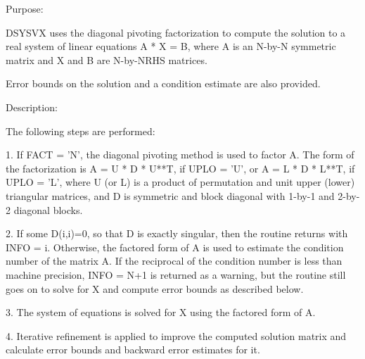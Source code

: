  \begin{DoxyParagraph}{Purpose\+: }
\begin{DoxyVerb} DSYSVX uses the diagonal pivoting factorization to compute the
 solution to a real system of linear equations A * X = B,
 where A is an N-by-N symmetric matrix and X and B are N-by-NRHS
 matrices.

 Error bounds on the solution and a condition estimate are also
 provided.\end{DoxyVerb}
 
\end{DoxyParagraph}
\begin{DoxyParagraph}{Description\+: }
\begin{DoxyVerb} The following steps are performed:

 1. If FACT = 'N', the diagonal pivoting method is used to factor A.
    The form of the factorization is
       A = U * D * U**T,  if UPLO = 'U', or
       A = L * D * L**T,  if UPLO = 'L',
    where U (or L) is a product of permutation and unit upper (lower)
    triangular matrices, and D is symmetric and block diagonal with
    1-by-1 and 2-by-2 diagonal blocks.

 2. If some D(i,i)=0, so that D is exactly singular, then the routine
    returns with INFO = i. Otherwise, the factored form of A is used
    to estimate the condition number of the matrix A.  If the
    reciprocal of the condition number is less than machine precision,
    INFO = N+1 is returned as a warning, but the routine still goes on
    to solve for X and compute error bounds as described below.

 3. The system of equations is solved for X using the factored form
    of A.

 4. Iterative refinement is applied to improve the computed solution
    matrix and calculate error bounds and backward error estimates
    for it.\end{DoxyVerb}
 
\end{DoxyParagraph}

